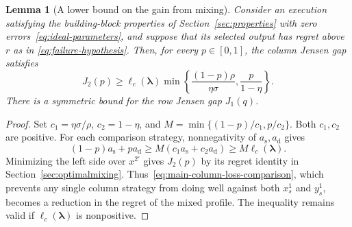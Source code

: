 \documentclass[11pt]{article}
\newtheorem{lemma}[theorem]{Lemma}
\theoremstyle{remark}
\theoremstyle{plain}
\begin{document}
\begin{lemma}[A lower bound on the gain from mixing]
\label{lem:main-jensen}
Consider an execution satisfying the building-block properties of
Section~\ref{sec:properties} with zero errors~\eqref{eq:ideal-parameters},
and suppose that its selected output has regret above $r$ as in
\eqref{eq:failure-hypothesis}. Then, for every $p\in[0,1]$,
the column Jensen gap satisfies
\[
 J_2(p)\ge\ell_c(\boldsymbol\lambda)
       \min\left\{\frac{(1-p)\rho}{\eta\sigma},\frac p{1-\eta}\right\}.
\]
There is a symmetric bound for the row Jensen gap $J_1(q)$.
\end{lemma}
\begin{proof}
Set $c_1=\eta\sigma/\rho$, $c_2=1-\eta$, and
$M=\min\{(1-p)/c_1,p/c_2\}$. Both $c_1,c_2$ are positive.
For each comparison strategy, nonnegativity of $a_{\mathrm s},a_{\mathrm d}$ gives
\[
 (1-p)a_{\mathrm s}+pa_{\mathrm d}
 \ge M(c_1a_{\mathrm s}+c_2a_{\mathrm d})\ge M\ell_c(\boldsymbol\lambda).
\]
Minimizing the left side over $x^{2\prime}$ gives $J_2(p)$ by its
regret identity in Section~\ref{sec:optimalmixing}.
Thus~\eqref{eq:main-column-loss-comparison}, which prevents any single
column strategy from doing well against both $x_s^1$ and $y_s^1$,
becomes a reduction in the regret of the mixed profile. The inequality remains
valid if $\ell_c(\boldsymbol\lambda)$ is nonpositive.
\end{proof}
\end{document}
